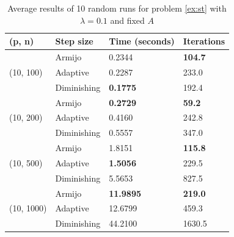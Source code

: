\documentclass[pdflatex,sn-mathphys-num]{sn-jnl}%
\theoremstyle{definition} %
\theoremstyle{remark} %
\begin{document}
\begin{table}[htbp]%
    \centering
    \caption{Average results of 10 random runs for problem \eqref{ex:st} with \( \lambda = 0.1 \) and fixed $A$}
    \begin{tabular}{l p{2.5cm} p{2.5cm} p{2.5cm}}
        \toprule
        (p, n) & Step size & Time (seconds) & Iterations \\
        \midrule
        \multirow{3}{*}{(10, 100)} 
          & Armijo & 0.2344 & \textbf{104.7} \\
          & Adaptive & 0.2287 & 233.0 \\
          & Diminishing & \textbf{0.1775} & 192.4 \\
        \midrule
        \multirow{3}{*}{(10, 200)} 
          & Armijo & \textbf{0.2729} & \textbf{59.2} \\
          & Adaptive & 0.4160 & 242.8 \\
          & Diminishing & 0.5557 & 347.0 \\
        \midrule
        \multirow{3}{*}{(10, 500)} 
          & Armijo & 1.8151 & \textbf{115.8} \\
          & Adaptive & \textbf{1.5056} & 229.5 \\
          & Diminishing & 5.5653 & 827.5 \\
        \midrule
        \multirow{3}{*}{(10, 1000)} 
          & Armijo & \textbf{11.9895} & \textbf{219.0} \\
          & Adaptive & 12.6799 & 459.3 \\
          & Diminishing & 44.2100 & 1630.5 \\
        \bottomrule
    \end{tabular}
    \label{experi_stiefel}
\end{table}
\end{document}

